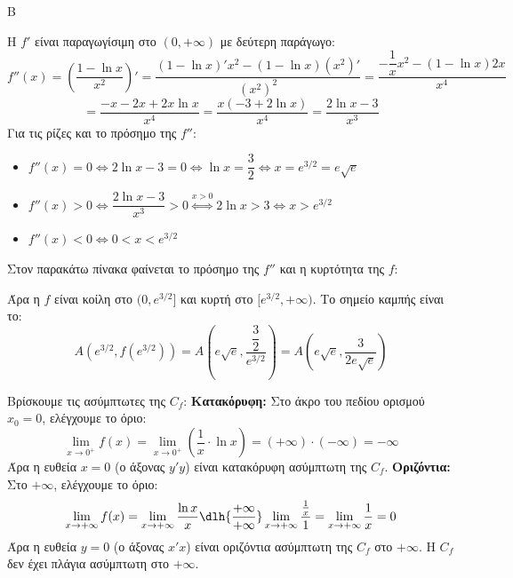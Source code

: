 \begin{thema}{Β}
\begin{erwthma}
\item Η $f'$ είναι παραγωγίσιμη στο $(0, +\infty)$ με δεύτερη παράγωγο:
\[ f''(x) = \left( \dfrac{1-\ln x}{x^2} \right)' = \dfrac{(1-\ln x)'x^2 - (1-\ln x)(x^2)'}{(x^2)^2} = \dfrac{-\dfrac{1}{x}x^2 - (1-\ln x)2x}{x^4} \]
\[ = \dfrac{-x - 2x + 2x\ln x}{x^4} = \dfrac{x(-3 + 2\ln x)}{x^4} = \dfrac{2\ln x - 3}{x^3} \]
Για τις ρίζες και το πρόσημο της $f''$:
\begin{itemize}
    \item $f''(x) = 0 \Leftrightarrow 2\ln x - 3 = 0 \Leftrightarrow \ln x = \dfrac{3}{2} \Leftrightarrow x = e^{3/2} = e\sqrt{e}$
    \item $f''(x) > 0 \Leftrightarrow \dfrac{2\ln x - 3}{x^3} > 0 \stackrel{x>0}{\Leftrightarrow} 2\ln x > 3 \Leftrightarrow x > e^{3/2}$
    \item $f''(x) < 0 \Leftrightarrow 0 < x < e^{3/2}$
\end{itemize}
Στον παρακάτω πίνακα φαίνεται το πρόσημο της $f''$ και η κυρτότητα της $f$:
\begin{center}
\end{center}
Άρα η $f$ είναι κοίλη στο $(0, e^{3/2}]$ και κυρτή στο $[e^{3/2}, +\infty)$. Το σημείο καμπής είναι το:
\[ A\left( e^{3/2}, f(e^{3/2}) \right) = A\left( e\sqrt{e}, \dfrac{\dfrac{3}{2}}{e^{3/2}} \right) = A\left( e\sqrt{e}, \dfrac{3}{2e\sqrt{e}} \right) \]

\item Βρίσκουμε τις ασύμπτωτες της $C_f$:
\textbf{Κατακόρυφη:} Στο άκρο του πεδίου ορισμού $x_0 = 0$, ελέγχουμε το όριο:
\[ \lim_{x\to0^+} f(x) = \lim_{x\to0^+} \left( \dfrac{1}{x} \cdot \ln x \right) = (+\infty) \cdot (-\infty) = -\infty \]
Άρα η ευθεία $x = 0$ (ο άξονας $y'y$) είναι κατακόρυφη ασύμπτωτη της $C_f$.
\textbf{Οριζόντια:} Στο $+\infty$, ελέγχουμε το όριο:
\[ \lim_{x\to+\infty} f(x) = \lim_{x\to+\infty} \dfrac{\ln x}{x} \dlh{\frac{+\infty}{+\infty}} \lim_{x\to+\infty} \dfrac{\frac{1}{x}}{1} = \lim_{x\to+\infty} \dfrac{1}{x} = 0 \]
Άρα η ευθεία $y = 0$ (ο άξονας $x'x$) είναι οριζόντια ασύμπτωτη της $C_f$ στο $+\infty$. Η $C_f$ δεν έχει πλάγια ασύμπτωτη στο $+\infty$.


\end{erwthma}
\end{thema}
